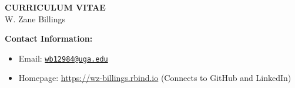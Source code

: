\documentclass[11pt]{article}
\begin{document}
\begin{center}
\large{
	{\bf CURRICULUM VITAE} \\
	W. Zane Billings \\}
	\hrulefill
\end{center}

\normalsize

{\bf Contact Information:}
\begin{itemize}[noitemsep]
\item Email: \href{mailto:wb12984@uga.edu}{\texttt{wb12984@uga.edu}}
\item Homepage: \url{https://wz-billings.rbind.io} (Connects to GitHub and LinkedIn)
\end{itemize}

\vspace{0.2in}


\vspace{0.2in}


\vspace{0.2in}


\vspace{0.2in}


%

\vspace{0.2in}


\vspace{0.2in}

\end{document}
